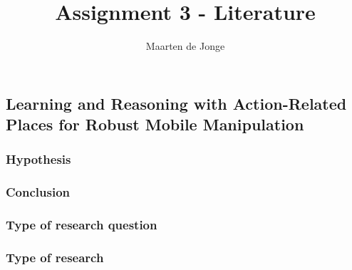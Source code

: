 \documentclass[a4paper, 10pt]{article}
\author{Maarten de Jonge}
\title{Assignment 3 - Literature}
\begin{document}
\maketitle

\section{}
\subsection{Learning and Reasoning with Action-Related Places for Robust Mobile Manipulation}
\subsubsection*{Hypothesis}
\subsubsection*{Conclusion}
\subsubsection*{Type of research question}
\subsubsection*{Type of research}
\end{document}
